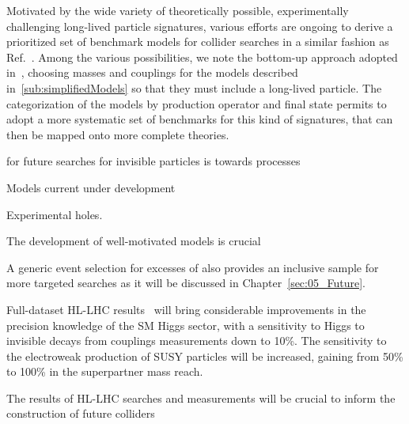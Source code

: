 Motivated by the wide variety of theoretically possible, experimentally challenging long-lived particle signatures, various efforts are ongoing to derive a prioritized set of benchmark models for collider searches in a similar fashion as Ref.~\cite{Abercrombie:2015wmb}. 
Among the various possibilities, we note the bottom-up approach adopted in~\cite{Buchmueller:2017uqu}, choosing masses and couplings for the models described in~\ref{sub:simplifiedModels} so that they must include a long-lived particle. 
The categorization of the models by production operator and final state permits to adopt a more systematic set of benchmarks for this kind of signatures, that can then be mapped onto more complete theories. 



for future searches for invisible particles is towards processes 

Models current under development 

Experimental holes. 


The development of well-motivated models is crucial 

A generic event selection for excesses of \MET also provides an inclusive sample for more targeted searches as it will be discussed in Chapter~\ref{sec:05_Future}. 

Full-dataset HL-LHC results~\cite{Campana:2016cqm} will bring considerable improvements in the precision knowledge of the SM Higgs sector, with a sensitivity to Higgs to invisible decays from couplings measurements down to 10\%. %
The sensitivity to the electroweak production of SUSY particles will be increased, gaining from 50\% to 100\% in the superpartner mass reach. %

The results of HL-LHC searches and measurements will be crucial to inform the construction of future colliders

\cite{Ilten:2016tkc} %
\cite{Ilten:2018crw} %
\cite{Golling:2016gvc} %
\cite{Liu:2017zdh} %


